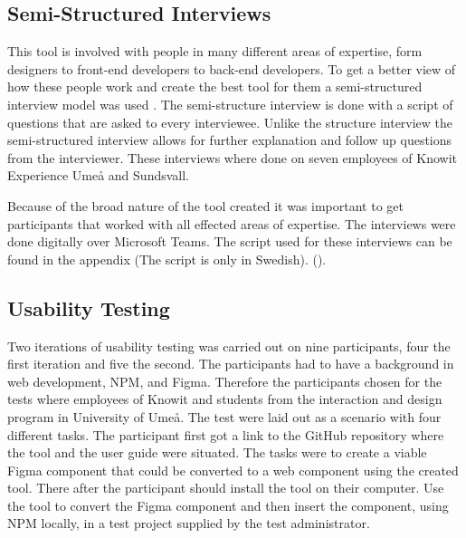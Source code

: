 \subsection{Semi-Structured Interviews}%
\label{sub:inteviews}
This tool is involved with people in many different areas of expertise, form designers to front-end developers to back-end developers. To get a better view of how these people work and create the best tool for them a semi-structured interview model was used \cite{galletta2013mastering}. The semi-structure interview is done with a script of questions that are asked to every interviewee. Unlike the structure interview the semi-structured interview allows for further explanation and follow up questions from the interviewer. These interviews where done on seven employees of Knowit Experience Umeå and Sundsvall. 

Because of the broad nature of the tool created it was important to get participants that worked with all effected areas of expertise. The interviews were done digitally over Microsoft Teams. The script used for these interviews can be found in the appendix (The script is only in Swedish). ().






\subsection{Usability Testing}%
\label{sub:usertesting}
Two iterations of usability testing was carried out on nine participants, four the first iteration and five the second. The participants had to have a background in web development, NPM, and Figma.  Therefore the participants chosen for the tests where employees of Knowit and students from the interaction and design program in University of Umeå. The test were laid out as a scenario with four different tasks. The participant first got a link to the GitHub repository where the tool and the user guide were situated. The tasks were to create a viable Figma component that could be converted to a web component using the created tool. There after the participant should install the tool on their computer. Use the tool to convert the Figma component and then insert the component, using NPM locally, in a test project supplied by the test administrator.

